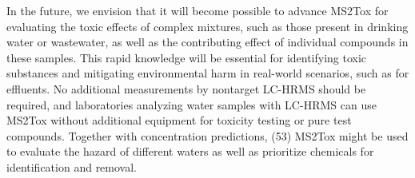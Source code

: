 In the future, we envision that it will become possible to advance MS2Tox for evaluating the toxic effects of complex mixtures, such as those present in drinking water or wastewater, as well as the contributing effect of individual compounds in these samples. This rapid knowledge will be essential for identifying toxic substances and mitigating environmental harm in real-world scenarios, such as for effluents. No additional measurements by nontarget LC-HRMS should be required, and laboratories analyzing water samples with LC-HRMS can use MS2Tox without additional equipment for toxicity testing or pure test compounds. Together with concentration predictions, (53) MS2Tox might be used to evaluate the hazard of different waters as well as prioritize chemicals for identification and removal.